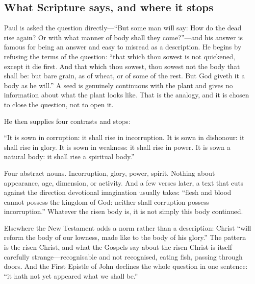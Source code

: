 \subsection{What Scripture says, and where it stops}

Paul is asked the question directly---``But some man will say: How do the dead rise again? Or with what manner of body shall they come?''---and his answer is famous for being an answer and easy to misread as a description. He begins by refusing the terms of the question: ``that which thou sowest is not quickened, except it die first. And that which thou sowest, thou sowest not the body that shall be: but bare grain, as of wheat, or of some of the rest. But God giveth it a body as he will.'' A seed is genuinely continuous with the plant and gives no information about what the plant looks like. That is the analogy, and it is chosen to close the question, not to open it.

He then supplies four contrasts and stops:

\begin{studyframe}
``It is sown in corruption: it shall rise in incorruption. It is sown in dishonour: it shall rise in glory. It is sown in weakness: it shall rise in power. It is sown a natural body: it shall rise a spiritual body.''
\end{studyframe}

Four abstract nouns. Incorruption, glory, power, spirit. Nothing about appearance, age, dimension, or activity. And a few verses later, a text that cuts against the direction devotional imagination usually takes: ``flesh and blood cannot possess the kingdom of God: neither shall corruption possess incorruption.'' Whatever the risen body is, it is not simply this body continued.

Elsewhere the New Testament adds a norm rather than a description: Christ ``will reform the body of our lowness, made like to the body of his glory.'' The pattern is the risen Christ, and what the Gospels say about the risen Christ is itself carefully strange---recognisable and not recognised, eating fish, passing through doors. And the First Epistle of John declines the whole question in one sentence: ``it hath not yet appeared what we shall be.''

